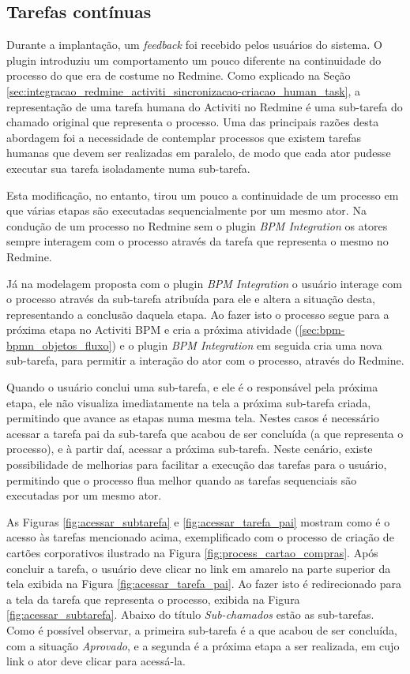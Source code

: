 \subsection{Tarefas contínuas}

Durante a implantação, um \textit{feedback} foi recebido pelos usuários do sistema. O plugin introduziu um comportamento um pouco diferente na continuidade do processo do que era de costume no Redmine. Como explicado na Seção \ref{sec:integracao_redmine_activiti_sincronizacao-criacao_human_task}, a representação de uma tarefa humana do Activiti no Redmine é uma sub-tarefa do chamado original que representa o processo. Uma das principais razões desta abordagem foi a necessidade de contemplar processos que existem tarefas humanas que devem ser realizadas em paralelo, de modo que cada ator pudesse executar sua tarefa isoladamente numa sub-tarefa. 

Esta modificação, no entanto, tirou um pouco a continuidade de um processo em que várias etapas são executadas sequencialmente por um mesmo ator. Na condução de um processo no Redmine sem o plugin \textit{BPM Integration} os atores sempre interagem com o processo através da tarefa que representa o mesmo no Redmine. 

Já na modelagem proposta com o plugin \textit{BPM Integration} o usuário interage com o processo através da sub-tarefa atribuída para ele e altera a situação desta, representando a conclusão daquela etapa. Ao fazer isto o processo segue para a próxima etapa no Activiti BPM e cria a próxima atividade (\ref{sec:bpm-bpmn_objetos_fluxo}) e o plugin \textit{BPM Integration} em seguida cria uma nova sub-tarefa, para permitir a interação do ator com o processo, através do Redmine. 

Quando o usuário conclui uma sub-tarefa, e ele é o responsável pela próxima etapa, ele não visualiza imediatamente na tela a próxima sub-tarefa criada, permitindo que avance as etapas numa mesma tela. Nestes casos é necessário acessar a tarefa pai da sub-tarefa que acabou de ser concluída (a que representa o processo), e à partir daí, acessar a próxima sub-tarefa. Neste cenário, existe possibilidade de melhorias para facilitar a execução das tarefas para o usuário, permitindo que o processo flua melhor quando as tarefas sequenciais são executadas por um mesmo ator.

As Figuras \ref{fig:acessar_subtarefa} e \ref{fig:acessar_tarefa_pai} mostram como é o acesso às tarefas mencionado acima, exemplificado com o processo de criação de cartões corporativos ilustrado na Figura \ref{fig:process_cartao_compras}. Após concluir a tarefa, o usuário deve clicar no link em amarelo na parte superior da tela exibida na Figura \ref{fig:acessar_tarefa_pai}. Ao fazer isto é redirecionado para a tela da tarefa que representa o processo, exibida na Figura \ref{fig:acessar_subtarefa}. Abaixo do título \textit{Sub-chamados} estão as sub-tarefas. Como é possível observar, a primeira sub-tarefa é a que acabou de ser concluída, com a situação \textit{Aprovado}, e a segunda é a próxima etapa a ser realizada, em cujo link o ator deve clicar para acessá-la.

